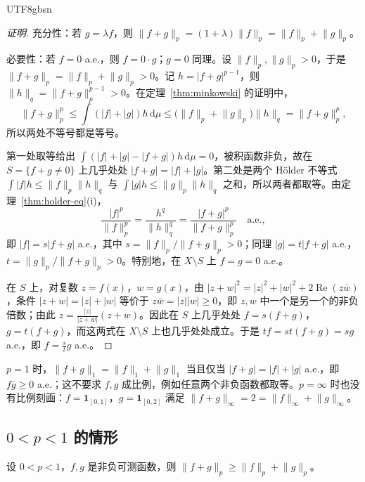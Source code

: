 \documentclass[11pt]{article}
\newcommand{\norm}[1]{\lVert #1\rVert}
\newcommand{\dmu}{\,\mathrm{d}\mu}
\newcommand{\ind}{\mathbf{1}}
\begin{document}
\begin{CJK*}{UTF8}{gbsn}
\begin{proof}[证明]
充分性：若 $g=\lambda f$，则 $\norm{f+g}_{p}=(1+\lambda)\norm{f}_{p}=\norm{f}_{p}+\norm{g}_{p}$。

必要性：若 $f=0$ a.e.，则 $f=0\cdot g$；$g=0$ 同理。设 $\norm{f}_{p},\norm{g}_{p}>0$，于是 $\norm{f+g}_{p}=\norm{f}_{p}+\norm{g}_{p}>0$。记 $h=|f+g|^{p-1}$，则 $\norm{h}_{q}=\norm{f+g}_{p}^{p-1}>0$。在定理~\ref{thm:minkowski} 的证明中，
\[
\norm{f+g}_{p}^{p}\le\int(|f|+|g|)h\dmu\le\bigl(\norm{f}_{p}+\norm{g}_{p}\bigr)\norm{h}_{q}=\norm{f+g}_{p}^{p},
\]
所以两处不等号都是等号。

第一处取等给出 $\int(|f|+|g|-|f+g|)h\dmu=0$，被积函数非负，故在 $S=\{f+g\ne0\}$ 上几乎处处 $|f+g|=|f|+|g|$。第二处是两个 Hölder 不等式 $\int|f|h\le\norm{f}_{p}\norm{h}_{q}$ 与 $\int|g|h\le\norm{g}_{p}\norm{h}_{q}$ 之和，所以两者都取等。由定理~\ref{thm:holder-eq}(i)，
\[
\frac{|f|^{p}}{\norm{f}_{p}^{p}}=\frac{h^{q}}{\norm{h}_{q}^{q}}=\frac{|f+g|^{p}}{\norm{f+g}_{p}^{p}}\quad\text{a.e.},
\]
即 $|f|=s|f+g|$ a.e.，其中 $s=\norm{f}_{p}/\norm{f+g}_{p}>0$；同理 $|g|=t|f+g|$ a.e.，$t=\norm{g}_{p}/\norm{f+g}_{p}>0$。特别地，在 $X\setminus S$ 上 $f=g=0$ a.e.。

在 $S$ 上，对复数 $z=f(x)$，$w=g(x)$，由 $|z+w|^{2}=|z|^{2}+|w|^{2}+2\operatorname{Re}(z\bar w)$，条件 $|z+w|=|z|+|w|$ 等价于 $z\bar w=|z||w|\ge0$，即 $z,w$ 中一个是另一个的非负倍数；由此 $z=\frac{|z|}{|z+w|}(z+w)$。因此在 $S$ 上几乎处处 $f=s(f+g)$，$g=t(f+g)$，而这两式在 $X\setminus S$ 上也几乎处处成立。于是 $tf=st(f+g)=sg$ a.e.，即 $f=\frac{s}{t}g$ a.e.。
\end{proof}

\begin{remark}
$p=1$ 时，$\norm{f+g}_{1}=\norm{f}_{1}+\norm{g}_{1}$ 当且仅当 $|f+g|=|f|+|g|$ a.e.，即 $f\bar g\ge0$ a.e.；这不要求 $f,g$ 成比例，例如任意两个非负函数都取等。$p=\infty$ 时也没有比例刻画：$f=\ind_{[0,1]}$，$g=\ind_{[0,2]}$ 满足 $\norm{f+g}_{\infty}=2=\norm{f}_{\infty}+\norm{g}_{\infty}$。
\end{remark}

\subsection{$0<p<1$ 的情形}

\begin{proposition}\label{prop:reverse}
设 $0<p<1$，$f,g$ 是非负可测函数，则 $\norm{f+g}_{p}\ge\norm{f}_{p}+\norm{g}_{p}$。
\end{proposition}


\end{CJK*}
\end{document}
